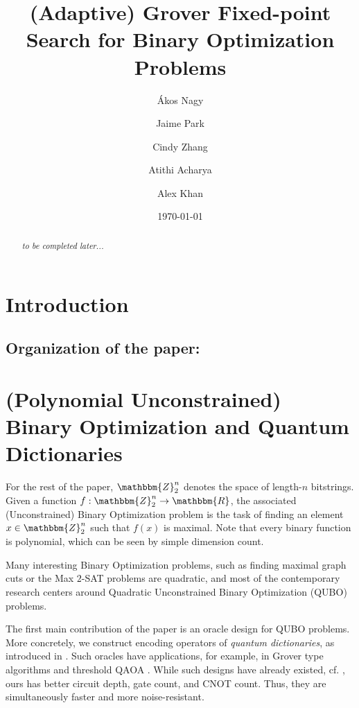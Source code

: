 \documentclass[reqno,oneside,12pt]{amsart}  %
\title{(Adaptive) Grover Fixed-point Search for Binary Optimization Problems}
\date{\today}
\author{\'Akos Nagy}
\author{Jaime Park}
\author{Cindy Zhang}
\author{Atithi Acharya}
\author{Alex Khan}
\numberwithin{equation}{section}                %
\newtheorem*{acknowledgment}{Acknowledgments}
\def\rl{\mathbbm{R}}
\def\Z{\mathbbm{Z}}
\begin{document}
\begin{abstract}
	\emph{to be completed later...}
\end{abstract}

\maketitle

\section{Introduction}


\smallskip

\subsection*{Organization of the paper:} 


\begin{comment}
\smallskip

\begin{acknowledgment}
   
\end{acknowledgment}
\end{comment}

\bigskip

\section{(Polynomial Unconstrained) Binary Optimization and Quantum Dictionaries}
\label{sec:qubos_and_qdicts}

For the rest of the paper, $\Z_2^n$ denotes the space of length-$n$ bitstrings. Given a function $f : \Z_2^n \rightarrow \rl$, the associated (Unconstrained) Binary Optimization problem is the task of finding an element $x \in \Z_2^n$ such that $f (x)$ is maximal. Note that every binary function is polynomial, which can be seen by simple dimension count.

Many interesting Binary Optimization problems, such as finding maximal graph cuts or the Max $2$-SAT problems are quadratic, and most of the contemporary research centers around Quadratic Unconstrained  Binary Optimization (QUBO) problems.

\medskip

The first main contribution of the paper is an oracle design for QUBO problems. More concretely, we construct encoding operators of \emph{quantum dictionaries}, as introduced in \cite{gilliam_foundational_2021}. Such oracles have applications, for example, in Grover type algorithms and threshold QAOA \cite{golden_threshold_2021}. While such designs have already existed, cf. \cite{gilliam_grover_2021}, ours has better circuit depth, gate count, and CNOT count. Thus, they are simultaneously faster and more noise-resistant.
\end{document}
